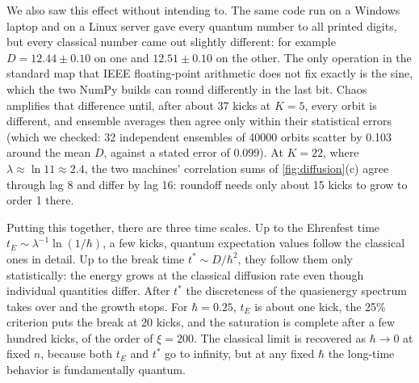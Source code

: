 We also saw this effect without intending to. The same code run on a Windows laptop and on a Linux server
gave every quantum number to all printed digits, but every classical number came out slightly different: for
example $D = 12.44 \pm 0.10$ on one and $12.51 \pm 0.10$ on the other. The only operation in the standard
map that IEEE floating-point arithmetic does not fix exactly is the sine, which the two NumPy builds can
round differently in the last bit. Chaos amplifies that difference until, after about 37 kicks at $K = 5$,
every orbit is different, and ensemble averages then agree only within their statistical errors (which we
checked: 32 independent ensembles of 40000 orbits scatter by 0.103 around the mean $D$, against a stated
error of 0.099). At $K = 22$, where $\lambda \approx \ln 11 \approx 2.4$, the two machines' correlation sums
of \cref{fig:diffusion}(c) agree through lag 8 and differ by lag 16: roundoff needs only about 15 kicks to
grow to order 1 there.

Putting this together, there are three time scales. Up to the Ehrenfest time
$t_E \sim \lambda^{-1}\ln(1/\hbar)$, a few kicks, quantum expectation values follow the classical ones in
detail. Up to the break time $t^* \sim D/\hbar^2$, they follow them only statistically: the energy grows at
the classical diffusion rate even though individual quantities differ. After $t^*$ the discreteness of the
quasienergy spectrum takes over and the growth stops. For $\hbar = 0.25$, $t_E$ is about one kick, the 25\%
criterion puts the break at 20 kicks, and the saturation is complete after a few hundred kicks, of the order
of $\xi = 200$. The classical limit is recovered as $\hbar\to0$ at fixed $n$, because both $t_E$ and $t^*$ go to
infinity, but at any fixed $\hbar$ the long-time behavior is fundamentally quantum.
